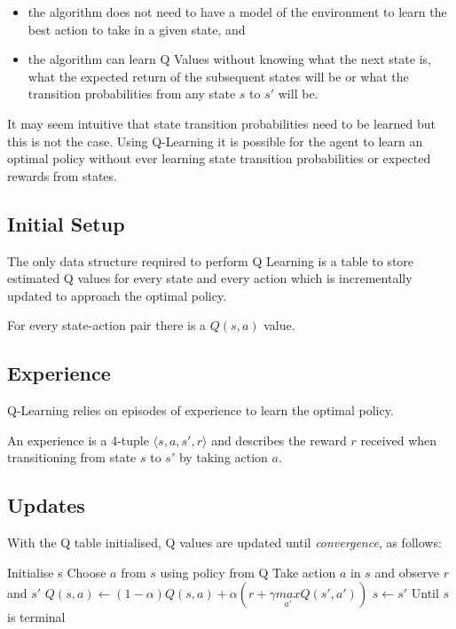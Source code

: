 \documentclass{article}
\begin{document}
\begin{itemize}
    \item the algorithm does not need to have a model of the environment to learn the best action to take in a given state, and 
    
    \item the algorithm can learn Q Values without knowing what the next state is, what the expected return of the subsequent states will be or what the transition probabilities from any state $s$ to $s'$ will be. 
\end{itemize}

It may seem intuitive that state transition probabilities need to be learned but this is not the case. Using Q-Learning it is possible for the agent to learn an optimal policy without ever learning state transition probabilities or expected rewards from states\cite{RLNotes}.

\subsection{Initial Setup}

The only data structure required to perform Q Learning is a table to store estimated Q values for every state and every action which is incrementally updated to approach the optimal policy.

For every state-action pair there is a $Q(s,a)$ value.

\subsection{Experience}

Q-Learning relies on episodes of experience to learn the optimal policy. 

An experience is a 4-tuple $ \langle s, a, s', r \rangle$
and describes the reward $r$ received when transitioning from state $s$ to $s'$ by taking action $a$.

\newpage

\subsection{Updates}

With the Q table initialised, Q values are updated until \textit{convergence}, as follows: 

\begin{algorithmic}
        \State Initialise s
            \State Choose $a$ from $s$ using policy from Q
            \State Take action $a$ in $s$ and observe $r$ and $s'$
            \State $Q(s,a) \gets (1 - \alpha) Q(s,a) + \alpha (r + \gamma \underset{a'}{max}Q(s', a'))$
            \State $s \gets s'$
        \EndFor
        \State Until $s$ is terminal
    \EndFor
\end{algorithmic}
\end{document}
